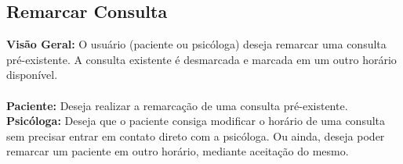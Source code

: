 \documentclass[a4paper,12pt]{report}
\begin{document}
\subsection{Remarcar Consulta}
\textbf{Visão Geral:} O usuário (paciente ou psicóloga) deseja remarcar uma consulta pré-existente. A consulta existente é desmarcada e marcada em um outro horário disponível.
\\
\\
\textbf{Paciente:} Deseja realizar a remarcação de uma consulta pré-existente.
\\
\textbf{Psicóloga:} Deseja que o paciente consiga modificar o horário de uma consulta sem precisar entrar em contato direto com a psicóloga. Ou ainda, deseja poder remarcar um paciente em outro horário, mediante aceitação do mesmo. 
\\
\end{document}
